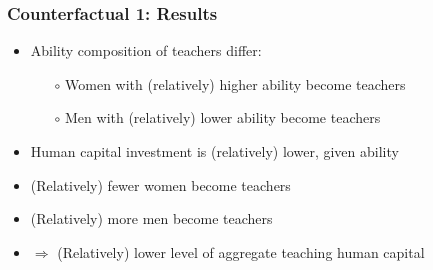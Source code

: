 \documentclass[11pt]{beamer}
\begin{document}
\begin{frame}
\frametitle{Counterfactual 1: Results}
\label{count}
\begin{itemize}
    \item Ability composition of teachers differ:
    \begin{itemize}
				\item[$\circ$] Women with (relatively) higher ability become teachers \hyperlink{counter_femaleabil}{} %
                \item[$\circ$] Men with (relatively) lower ability become teachers
                \hyperlink{counter_maleabil}{}%
    \end{itemize}
    \item Human capital investment is (relatively) lower, given ability \hyperlink{counter_invest}{} %
    \item (Relatively) fewer women become teachers
    \item (Relatively) more men become teachers
    \item $\Rightarrow$ (Relatively) lower level of aggregate teaching human capital  \hyperlink{counter_humcap}{}
\end{itemize}
\end{frame}

\end{document}
